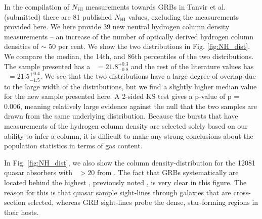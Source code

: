 \documentclass{aa}    %
\begin{document}
In the compilation of $N_{\mathrm{HI}}$ measurements towards GRBs in Tanvir et
al. (submitted) %
there are 81 published $N_{\mathrm{HI}}$ values, excluding the measurements
provided here. We here provide 39 new neutral hydrogen column density
measurements -- an increase of the number of optically derived hydrogen column
densities of $\sim$ 50 per cent. We show the two distributions in  Fig.
\ref{fig:NH_dist}. We compare the median, the 14th, and 86th percentiles of the
two distributions. The sample presented has a \nh~$= 21.8_{-0.8}^{+0.3}$ and the
rest of the literature values has \nh~$= 21.5_{-1.5}^{+0.4}$. We see that the
two distributions have a large degree of overlap due to the large width of the
distributions, but we find a slightly higher median value for the new sample
presented here. A 2-sided KS test gives a p-value of p = 0.006, meaning
relatively large evidence against the null that the two samples are drawn from
the same underlying distribution. Because the bursts that have measurements of
the hydrogen column density are selected solely based on our ability to infer a
column, it is difficult to make any strong conclusions about the population
statistics in terms of gas content.

In Fig. \ref{fig:NH_dist}, we also show the column density-distribution
for the 12081 quasar absorbers with \nh~$> 20$ from \citet{Noterdaeme2012b}. The
fact that GRBs systematically are located behind the highest \nh, previously
noted \citep[e.g.,][]{Prochaska2007, Fynbo2009}, is very clear in this
figure. The reason for this is that quasar sample sight-lines through galaxies
that are cross-section selected, whereas GRB sight-lines probe the dense,
star-forming regions in their hosts.
\end{document}

